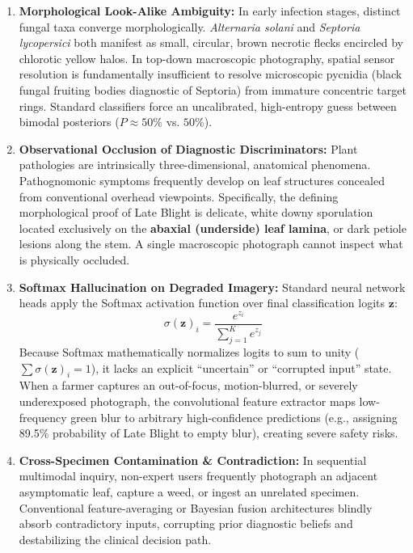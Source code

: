\documentclass[conference]{IEEEtran}
\begin{document}
\begin{enumerate}
    \item \textbf{Morphological Look-Alike Ambiguity:} In early infection stages, distinct fungal taxa converge morphologically. \textit{Alternaria solani} and \textit{Septoria lycopersici} both manifest as small, circular, brown necrotic flecks encircled by chlorotic yellow halos. In top-down macroscopic photography, spatial sensor resolution is fundamentally insufficient to resolve microscopic pycnidia (black fungal fruiting bodies diagnostic of Septoria) from immature concentric target rings. Standard classifiers force an uncalibrated, high-entropy guess between bimodal posteriors ($P \approx 50\%$ vs. $50\%$).
    \item \textbf{Observational Occlusion of Diagnostic Discriminators:} Plant pathologies are intrinsically three-dimensional, anatomical phenomena. Pathognomonic symptoms frequently develop on leaf structures concealed from conventional overhead viewpoints. Specifically, the defining morphological proof of Late Blight is delicate, white downy sporulation located exclusively on the \textbf{abaxial (underside) leaf lamina}, or dark petiole lesions along the stem. A single macroscopic photograph cannot inspect what is physically occluded.
    \item \textbf{Softmax Hallucination on Degraded Imagery:} Standard neural network heads apply the Softmax activation function over final classification logits $\mathbf{z}$:
    \begin{equation}
        \sigma(\mathbf{z})_i = \frac{e^{z_i}}{\sum_{j=1}^K e^{z_j}}
    \end{equation}
    Because Softmax mathematically normalizes logits to sum to unity ($\sum \sigma(\mathbf{z})_i = 1$), it lacks an explicit ``uncertain'' or ``corrupted input'' state. When a farmer captures an out-of-focus, motion-blurred, or severely underexposed photograph, the convolutional feature extractor maps low-frequency green blur to arbitrary high-confidence predictions (e.g., assigning 89.5\% probability of Late Blight to empty blur), creating severe safety risks.
    \item \textbf{Cross-Specimen Contamination \& Contradiction:} In sequential multimodal inquiry, non-expert users frequently photograph an adjacent asymptomatic leaf, capture a weed, or ingest an unrelated specimen. Conventional feature-averaging or Bayesian fusion architectures blindly absorb contradictory inputs, corrupting prior diagnostic beliefs and destabilizing the clinical decision path.
\end{enumerate}
\end{document}
